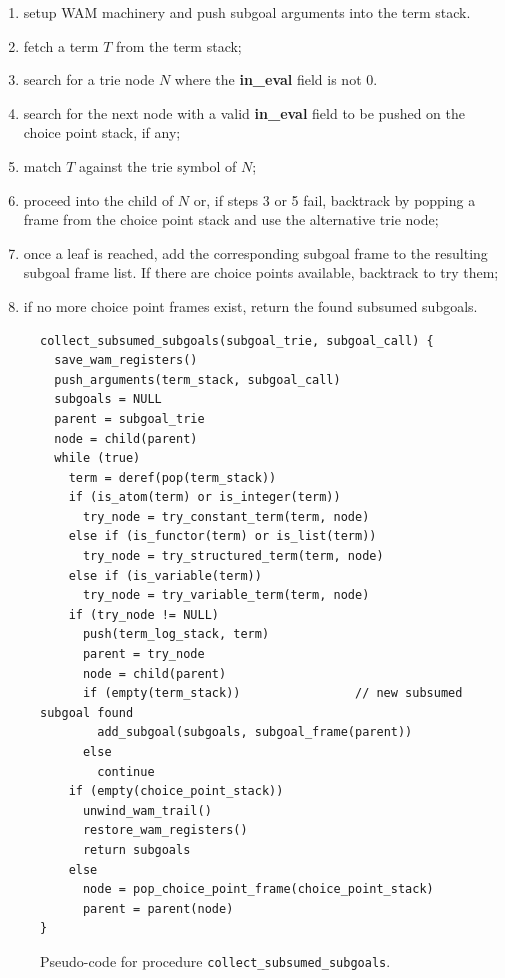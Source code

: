 \begin{enumerate}
\item setup WAM machinery and push subgoal arguments into the term
  stack.
\item fetch a term $T$ from the term stack;
\item search for a trie node $N$ where the \textbf{in\_eval} field is not 0.
\item search for the next node with a valid \textbf{in\_eval} field to be
  pushed on the choice point stack, if any;
\item match $T$ against the trie symbol of $N$;
\item proceed into the child of $N$ or, if steps 3 or 5 fail,
  backtrack by popping a frame from the choice point stack and use the
  alternative trie node;
\item once a leaf is reached, add the corresponding subgoal frame to
  the resulting subgoal frame list. If there are choice points
  available, backtrack to try them;
\item if no more choice point frames exist, return the found subsumed
  subgoals.
\end{enumerate}

\begin{figure}[ht]
\begin{Verbatim}
collect_subsumed_subgoals(subgoal_trie, subgoal_call) {
  save_wam_registers()
  push_arguments(term_stack, subgoal_call)
  subgoals = NULL
  parent = subgoal_trie
  node = child(parent)
  while (true)
    term = deref(pop(term_stack))    
    if (is_atom(term) or is_integer(term))
      try_node = try_constant_term(term, node)
    else if (is_functor(term) or is_list(term))
      try_node = try_structured_term(term, node)
    else if (is_variable(term))
      try_node = try_variable_term(term, node)
    if (try_node != NULL)
      push(term_log_stack, term)
      parent = try_node
      node = child(parent)
      if (empty(term_stack))                // new subsumed subgoal found
        add_subgoal(subgoals, subgoal_frame(parent))
      else
        continue
    if (empty(choice_point_stack))
      unwind_wam_trail()
      restore_wam_registers()
      return subgoals
    else
      node = pop_choice_point_frame(choice_point_stack)
      parent = parent(node)
}
\end{Verbatim}
\caption{Pseudo-code for procedure \texttt{collect\_subsumed\_subgoals}.}
\label{fig:collect_subsumed_subgoals}
\end{figure}

